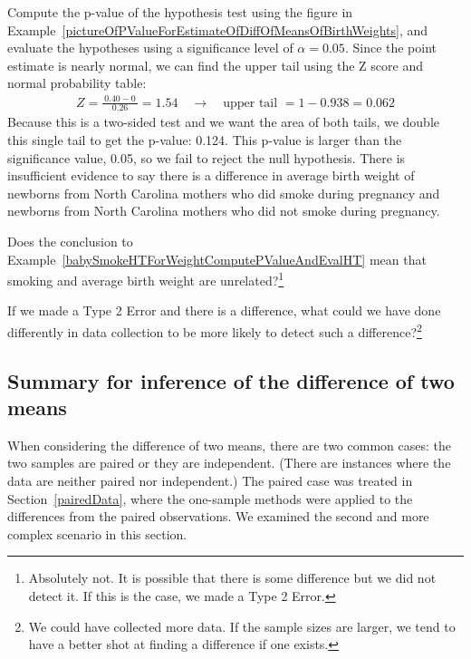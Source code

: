 \begin{example}{Compute the p-value of the hypothesis test using the figure in Example~\ref{pictureOfPValueForEstimateOfDiffOfMeansOfBirthWeights}, and evaluate the hypotheses using a significance level of $\alpha=0.05$.} \label{babySmokeHTForWeightComputePValueAndEvalHT}
Since the point estimate is nearly normal, we can find the upper tail using the Z score and normal probability table:
\begin{eqnarray*}
Z = \frac{\ 0.40 - 0\ }{0.26} = 1.54 \quad \to \quad \text{upper tail } = 1 - 0.938 = 0.062
\end{eqnarray*}
Because this is a two-sided test and we want the area of both tails, we double this single tail to get the p-value: 0.124. This p-value is larger than the significance value, 0.05, so we fail to reject the null hypothesis. There is insufficient evidence to say there is a difference in average birth weight of newborns from North Carolina mothers who did smoke during pregnancy and newborns from North Carolina mothers who did not smoke during pregnancy.
\end{example}

\begin{exercise}
Does the conclusion to Example~\ref{babySmokeHTForWeightComputePValueAndEvalHT} mean that smoking and average birth weight are unrelated?\footnote{Absolutely not. It is possible that there is some difference but we did not detect it. If this is the case, we made a Type 2 Error.}
\end{exercise}

\begin{exercise} \label{babySmokeHTIDingHowToDetectDifferences}
If we made a Type 2 Error and there is a difference, what could we have done differently in data collection to be more likely to detect such a difference?\footnote{We could have collected more data. If the sample sizes are larger, we tend to have a better shot at finding a difference if one exists.}


\end{exercise}

\subsection{Summary for inference of the difference of two means}

When considering the difference of two means, there are two common cases: the two samples are paired or they are independent. (There are instances where the data are neither paired nor independent.) The paired case was treated in Section~\ref{pairedData}, where the one-sample methods were applied to the differences from the paired observations. We examined the second and more complex scenario in this section.

